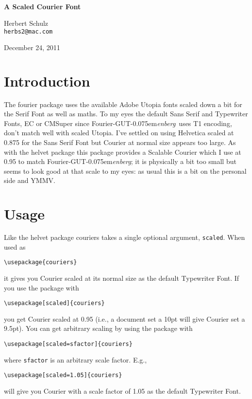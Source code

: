 \documentclass{article}
\newcommand{\fourier}{Fourier-GUT\kern-0.075em\textit{enberg}}
\newcommand{\pkg}[1]{\textsf{#1}}
\begin{document}
\begin{center}
{\Large\bfseries A Scaled Courier Font}

\vspace{3pt}
Herbert Schulz\\\texttt{herbs2@mac.com}

\vspace{3pt}
December 24, 2011
\end{center}

\begin{abstract}
The \pkg{couriers} package provides a scalable interface to the Courier Font for use as the Typewriter  Font with other type faces. It offers an interface just like that provided in the \pkg{helvet} package for the Helvetica Font used as the Sans Serif Font but with a different default magnification.
\end{abstract}

\section{Introduction}

The \pkg{fourier} package uses the available Adobe Utopia fonts scaled down a bit for the Serif Font as well as maths. To my eyes the default Sans Serif and Typewriter Fonts, EC or CMSuper since \fourier\ uses T1 encoding, don't match well with scaled Utopia. I've settled on using Helvetica scaled at 0.875 for the Sans Serif Font but Courier at normal size appears too large. As with the \pkg{helvet} package this package provides a Scalable Courier which I use at 0.95 to match  \fourier; it is physically a bit too small but seems to look good at that scale to my eyes: as usual this is a bit on the personal side and YMMV.

\section{Usage}

Like the \pkg{helvet} package \pkg{couriers} takes a single optional argument, \texttt{scaled}. When used as
\begin{verbatim}
\usepackage{couriers}
\end{verbatim}
it gives you Courier scaled at its normal size as the default Typewriter Font. If you use the package with
\begin{verbatim}
\usepackage[scaled]{couriers}
\end{verbatim}
you get Courier scaled at 0.95 (i.e., a document set a 10pt will give Courier set a 9.5pt). You can get arbitrary scaling by using the package with
\begin{verbatim}
\usepackage[scaled=sfactor]{couriers}
\end{verbatim}
where \texttt{sfactor} is an arbitrary scale factor. E.g.,
\begin{verbatim}
\usepackage[scaled=1.05]{couriers}
\end{verbatim}
will give you Courier with a scale factor of 1.05 as the default Typewriter Font.
\end{document}
